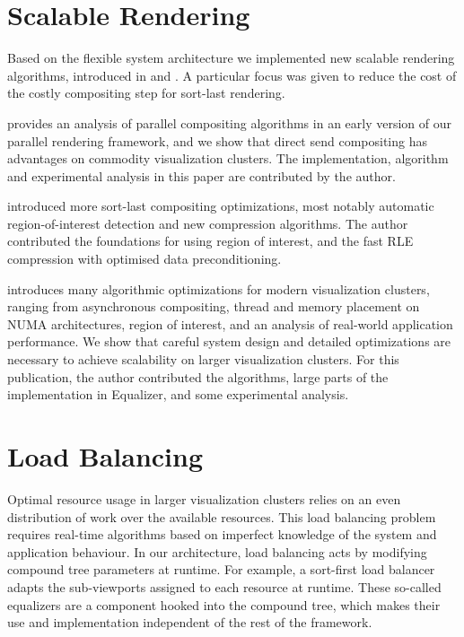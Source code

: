 \section{Scalable Rendering}

Based on the flexible system architecture we implemented new scalable rendering
algorithms, introduced in \cite{EMP:09} and \cite{ESP:18}. A particular focus
was given to reduce the cost of the costly compositing step for sort-last
rendering.

\cite{EP:07} provides an analysis of parallel compositing algorithms in an
early version of our parallel rendering framework, and we show that direct send
compositing has advantages on commodity visualization clusters. The
implementation, algorithm and experimental analysis in this paper are
contributed by the author.

\cite{MEP:10} introduced more sort-last compositing optimizations, most notably
automatic region-of-interest detection and new compression algorithms. The
author contributed the foundations for using region of interest, and the fast
RLE compression with optimised data preconditioning.

\cite{EBAHMP:12} introduces many algorithmic optimizations for modern
visualization clusters, ranging from asynchronous compositing, thread and
memory placement on NUMA architectures, region of interest, and an analysis of
real-world application performance. We show that careful system design and
detailed optimizations are necessary to achieve scalability on larger
visualization clusters. For this publication, the author contributed the
algorithms, large parts of the implementation in Equalizer, and some
experimental analysis.

\section{Load Balancing}

Optimal resource usage in larger visualization clusters relies on an even
distribution of work over the available resources. This load balancing problem
requires real-time algorithms based on imperfect knowledge of the system and
application behaviour. In our architecture, load balancing acts by modifying
compound tree parameters at runtime. For example, a sort-first load balancer
adapts the sub-viewports assigned to each resource at runtime. These so-called
\textsf{equalizers} are a component hooked into the compound tree, which makes
their use and implementation independent of the rest of the framework.

